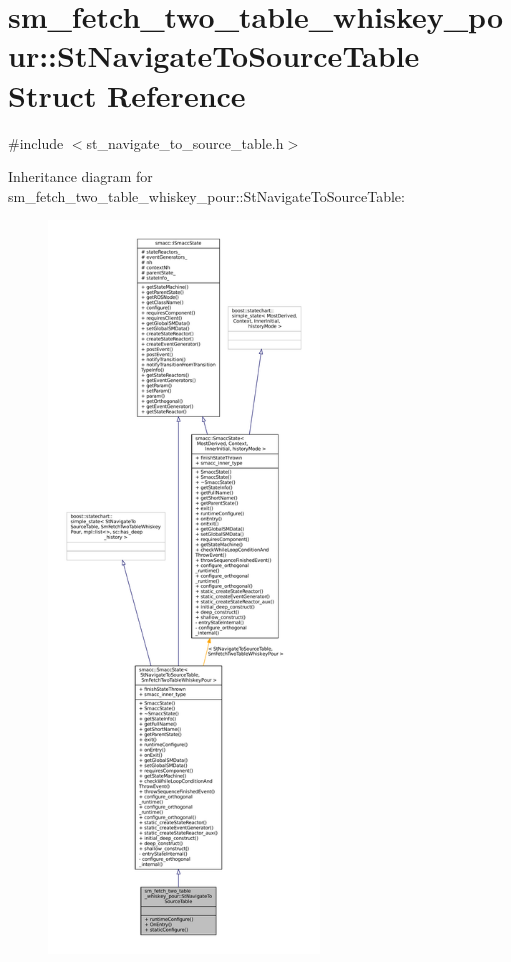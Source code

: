\hypertarget{structsm__fetch__two__table__whiskey__pour_1_1StNavigateToSourceTable}{}\section{sm\+\_\+fetch\+\_\+two\+\_\+table\+\_\+whiskey\+\_\+pour\+:\+:St\+Navigate\+To\+Source\+Table Struct Reference}
\label{structsm__fetch__two__table__whiskey__pour_1_1StNavigateToSourceTable}


{\ttfamily \#include $<$st\+\_\+navigate\+\_\+to\+\_\+source\+\_\+table.\+h$>$}



Inheritance diagram for sm\+\_\+fetch\+\_\+two\+\_\+table\+\_\+whiskey\+\_\+pour\+:\+:St\+Navigate\+To\+Source\+Table\+:
\nopagebreak
\begin{figure}[H]
\begin{center}
\leavevmode
\includegraphics[height=550pt]{structsm__fetch__two__table__whiskey__pour_1_1StNavigateToSourceTable__inherit__graph}
\end{center}
\end{figure}


